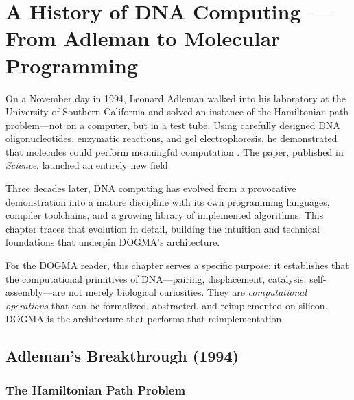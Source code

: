 
\chapter{A History of DNA Computing --- From Adleman to Molecular Programming}
\label{ch:dna-computing}


\noindent
On a November day in 1994, Leonard Adleman walked into his laboratory at the University of Southern California and solved an instance of the Hamiltonian path problem---not on a computer, but in a test tube. Using carefully designed DNA oligonucleotides, enzymatic reactions, and gel electrophoresis, he demonstrated that molecules could perform meaningful computation \citep{adleman1994}. The paper, published in \textit{Science}, launched an entirely new field.

Three decades later, DNA computing has evolved from a provocative demonstration into a mature discipline with its own programming languages, compiler toolchains, and a growing library of implemented algorithms. This chapter traces that evolution in detail, building the intuition and technical foundations that underpin DOGMA's architecture.

For the DOGMA reader, this chapter serves a specific purpose: it establishes that the computational primitives of DNA---pairing, displacement, catalysis, self-assembly---are not merely biological curiosities. They are \emph{computational operations} that can be formalized, abstracted, and reimplemented on silicon. DOGMA is the architecture that performs that reimplementation.

\section{Adleman's Breakthrough (1994)}
\label{sec:adleman}

\subsection{The Hamiltonian Path Problem}

